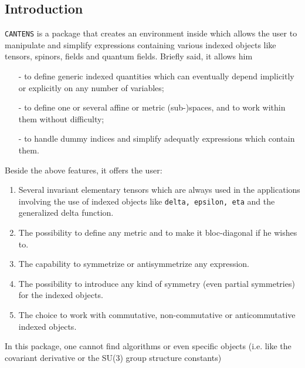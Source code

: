 

\subsection{Introduction}
\texttt{CANTENS} is a package that creates an environment
inside {\REDUCE}
which  allows the user to
manipulate and simplify expressions containing various indexed objects
like tensors, spinors, fields and quantum fields.
Briefly said, it allows him
\begin{itemize}
\item[-] to define generic indexed quantities which can eventually depend
implicitly or explicitly on any number of variables;
\item[-] to define one or several affine or metric (sub-)spaces, and to work
within them without difficulty;
\item[-] to handle dummy indices and simplify adequatly expressions
which contain them.
\end{itemize}
Beside the above features, it offers the user:
\begin{enumerate}
\item  Several invariant
elementary tensors  which are always used in the applications involving
the use of indexed objects like \texttt{delta, epsilon, eta} and the
generalized delta function.
\item The possibility to define any metric and to make it bloc-diagonal
if he wishes to.
\item The capability to symmetrize or antisymmetrize any expression.
\item The possibility to introduce any kind of symmetry (even partial symmetries)
for the indexed objects.
\item The choice to work with commutative, non-commutative or anticommutative
indexed objects.
\end{enumerate}
In this package, one cannot find  algorithms or even specific objects
(i.e. like the covariant derivative or the SU(3) group structure constants)
